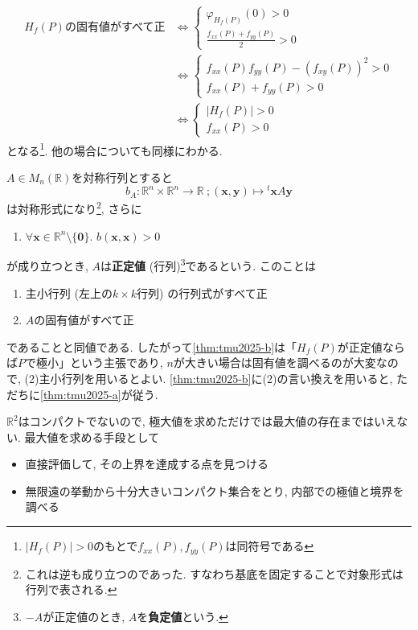\documentclass[titlepage]{jsarticle}
\numberwithin{equation}{section}
\newcommand{\R}{\mathbb{R}}%
\begin{document}
\begin{align*}
H_f(P)\text{の固有値がすべて正} 
& \iff 
\left\{
\begin{array}{l}
\varphi_{H_f(P)}(0) > 0\\
\frac{f_{xx}(P)+f_{yy}(P)}{2} > 0
\end{array}
\right. \\
& \iff
\left\{
\begin{array}{l}
f_{xx}(P)f_{yy}(P) - (f_{xy}(P))^2 > 0\\
{f_{xx}(P)+f_{yy}(P)}> 0
\end{array}
\right.\\
& \iff
\left\{
\begin{array}{l}
|H_f(P)| > 0\\
f_{xx}(P) > 0
\end{array}
\right.
\end{align*}
となる\footnote{$|H_f(P)| > 0$のもとで$f_{xx}(P), f_{yy}(P)$は同符号である}. 他の場合についても同様にわかる.
\begin{marker}
$A \in M_n(\R)$を対称行列とすると
\[
b_A : \R^n \times \R^n \to \R\:; (\bm{x}, \bm{y}) \mapsto {}^t\!\bm{x}A\bm{y}
\]
は対称形式になり\footnote{これは逆も成り立つのであった. すなわち基底を固定することで対象形式は行列で表される.}, さらに 
\begin{enumerate}
\item[(1)] $\forall \bm{x} \in \R^n \setminus \{\bm{0}\}.\,\, b(\bm{x}, \bm{x}) > 0$ 
\end{enumerate}
が成り立つとき, $A$は\textbf{正定値} (行列)\footnote{$-A$が正定値のとき, $A$を\textbf{負定値}という.}であるという. このことは
\begin{enumerate}
\item[(2)] 主小行列 (左上の$k \times k$行列) の行列式がすべて正
\item[(3)] $A$の固有値がすべて正
\end{enumerate}
であることと同値である. したがって\ref{thm:tmu2025-b}は「$H_f(P)$が正定値ならば$P$で極小」という主張であり, $n$が大きい場合は固有値を調べるのが大変なので, (2)主小行列を用いるとよい. \ref{thm:tmu2025-b}に(2)の言い換えを用いると, ただちに\ref{thm:tmu2025-a}が従う.
\end{marker}
$\R^2$はコンパクトでないので, 極大値を求めただけでは最大値の存在まではいえない. 最大値を求める手段として
\begin{itemize}
\item 直接評価して, その上界を達成する点を見つける
\item 無限遠の挙動から十分大きいコンパクト集合をとり, 内部での極値と境界を調べる
\end{itemize}
\end{document}
